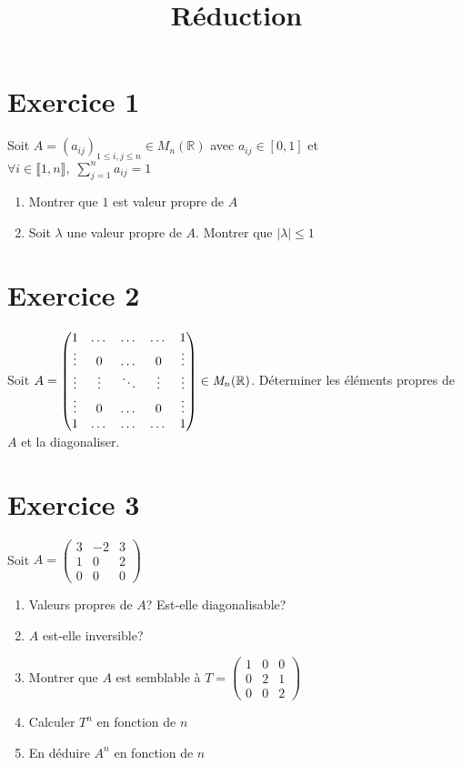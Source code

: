 \documentclass[11pt]{article}
\author{\Name \texttt{\Login}}
\date{}
\title{Réduction}
\begin{document}
\maketitle

\section*{Exercice 1}


Soit $A=(a_{ij})_{1\le{i,j}\le n} \in \textit{M}_n(\mathbb{R})$ avec $a_{ij}\in[0,1]$ et $\forall i \in \llbracket 1,n \rrbracket, \; \sum_{j=1}^n a_{ij} = 1$

\begin{enumerate}
\item Montrer que $1$ est valeur propre de $A$
\item Soit $\lambda$ une valeur propre de $A$. Montrer que $|\lambda|\le1$
\end{enumerate}

\section*{Exercice 2}

Soit $A =\begin{pmatrix}
1 & \dots & \dots & \dots & 1\\
\vdots & 0 & \dots & 0 & \vdots\\
\vdots & \vdots &\ddots  & \vdots & \vdots\\
\vdots & 0 & \dots & 0 & \vdots\\
1 & \dots & \dots & \dots & 1
\end{pmatrix} \in \emph{M}_n(\mathbb{R})$. Déterminer les éléments propres de $A$ et la diagonaliser.

\section*{Exercice 3}

Soit $A=\begin{pmatrix}
3 & -2 & 3\\
1 & 0 & 2\\
0 & 0 & 0
\end{pmatrix}$

\begin{enumerate}
\item Valeurs propres de $A$? Est-elle diagonalisable?
\item $A$ est-elle inversible?
\item Montrer que $A$ est semblable à $T=\begin{pmatrix}
1 & 0 & 0\\
0 & 2 & 1\\
0 & 0 & 2
\end{pmatrix}$
\item Calculer $T^n$ en fonction de $n$
\item En déduire $A^n$ en fonction de $n$
\end{enumerate}
\end{document}
